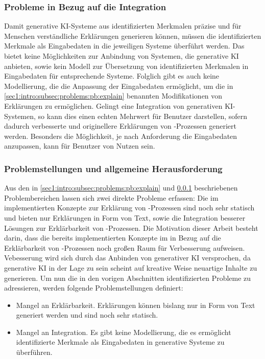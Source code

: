 \subsubsection{Probleme in Bezug auf die Integration}
\label{sec1:intro:subsec:problems:pb:integration}
Damit generative KI-Systeme aus identifizierten Merkmalen präzise und für Menschen verständliche Erklärungen generieren können, müssen die identifizierten Merkmale als Eingabedaten in die jeweiligen Systeme überführt werden.
\newline
Das \gmaf{} bietet keine Möglichkeiten zur Anbindung von Systemen, die generative KI anbieten, sowie kein Modell zur Übersetzung von identifizierten Merkmalen in Eingabedaten für entsprechende Systeme.
Folglich gibt es auch keine Modellierung, die die Anpassung der Eingabedaten ermöglicht, um die in \cref{sec1:intro:subsec:problems:pb:explain} benannten Modifikationen von Erklärungen zu ermöglichen.
\newline
Gelingt eine Integration von generativen KI-Systemen, so kann dies einen echten Mehrwert für Benutzer darstellen, sofern dadurch verbesserte und originellere Erklärungen von \mmir{}-Prozessen generiert werden.
Besonders die Möglichkeit, je nach Anforderung die Eingabedaten anzupassen, kann für Benutzer von Nutzen sein.

\subsubsection{Problemstellungen und allgemeine Herausforderung}
Aus den in \cref{sec1:intro:subsec:problems:pb:explain} und \cref{sec1:intro:subsec:problems:pb:integration} beschriebenen Problembereichen lassen sich zwei direkte Probleme erfassen:
Die im \gmaf{} implementierten Konzepte zur Erklärung von \mmir{}-Prozessen sind noch sehr statisch und bieten nur Erklärungen in Form von Text, sowie die Integration besserer Lösungen zur Erklärbarkeit von \mmir{}-Prozessen.
Die Motivation dieser Arbeit besteht darin, dass die bereits implementierten Konzepte im \gmaf{} in Bezug auf die Erklärbarkeit von \mmir{}-Prozessen noch großen Raum für Verbesserung aufweisen.
Vebesserung wird sich durch das Anbinden von generativer KI versprochen, da generative KI in der Lage zu sein scheint auf kreative Weise neuartige Inhalte zu generieren.
\newline
Um nun die in den vorigen Abschnitten identifizierten Probleme zu adressieren, werden folgende Problemstellungen definiert:
\begin{itemize}
    \item \problemstmt{} Mangel an Erklärbarkeit. Erklärungen können bislang nur in Form von Text generiert werden und sind noch sehr statisch.
    \item \problemstmt{} Mangel an Integration. Es gibt keine Modellierung, die es ermöglicht identifizierte Merkmale als Eingabedaten in generative Systeme zu überführen.
\end{itemize}

